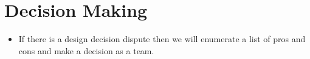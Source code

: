 \documentclass{article}
\begin{document}
\section{Decision Making}
\begin{itemize}
\item If there is a design decision dispute then we will enumerate a list of pros and cons and make a decision as a team.
\end{itemize}
\end{document}
